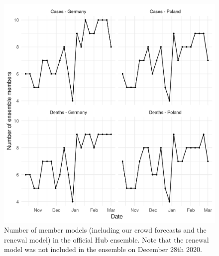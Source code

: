 \documentclass[
]{article}
\begin{document}
\begin{figure}[H]
\includegraphics[width=1\linewidth,]{../analysis/plots/ensemble-members} \caption{Number of member models (including our crowd forecasts and the renewal model) in the official Hub ensemble. Note that the renewal model was not included in the ensemble on December 28th 2020.}\label{fig:num-ensemble-members}
\end{figure}

\clearpage
\end{document}
